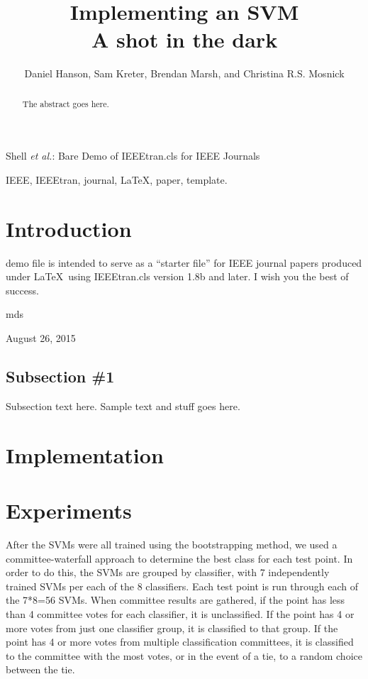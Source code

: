 \documentclass[journal]{IEEEtran}
\begin{document}
\title{Implementing an SVM\\ A shot in the dark}

\author{Daniel Hanson, Sam Kreter, Brendan Marsh, and Christina R.S. Mosnick}

{Shell \MakeLowercase{\textit{et al.}}: Bare Demo of IEEEtran.cls for IEEE Journals}

\maketitle

\begin{abstract}
The abstract goes here.
\end{abstract}

\begin{IEEEkeywords}
IEEE, IEEEtran, journal, \LaTeX, paper, template.
\end{IEEEkeywords}

\IEEEpeerreviewmaketitle

\section{Introduction}

 demo file is intended to serve as a ``starter file''
for IEEE journal papers produced under \LaTeX\ using
IEEEtran.cls version 1.8b and later.
I wish you the best of success.

\hfill mds

\hfill August 26, 2015

\subsection{Subsection \#1}
Subsection text here. Sample text and stuff goes here.

\section{Implementation}

\section{Experiments}

After the SVMs were all trained using the bootstrapping method, we used a committee-waterfall approach to determine the best class for each test point.  In order to do this, the SVMs are grouped by classifier, with 7 independently trained SVMs per each of the 8 classifiers.  Each test point is run through each of the 7*8=56 SVMs.  When committee results are gathered, if the point has less than 4 committee votes for each classifier, it is unclassified.  If the point has 4 or more votes from just one classifier group, it is classified to that group. If the point has 4 or more votes from multiple classification committees, it is classified to the committee with the most votes, or in the event of a tie, to a random choice between the tie.
\end{document}
